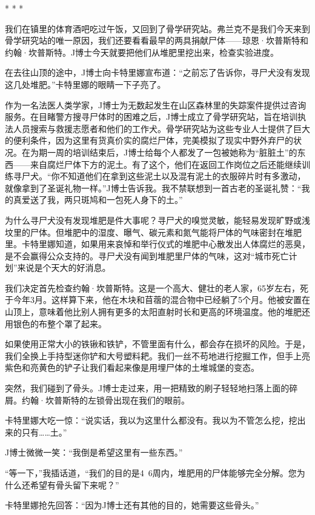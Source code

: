 \documentclass[12pt,oneside]{book}
\begin{document}
\begin{bookref}[frametitle={\cite{好好告别}}]
\begin{center}
* * *
\end{center}

我们在镇里的体育酒吧吃过午饭，又回到了骨学研究站。弗兰克不是我们今天来到骨学研究站的唯一原因，我们还要看看最早的两具捐献尸体——琼恩·坎普斯特和约翰·坎普斯特。J博士今天就要把他们从堆肥里挖出来，检查实验进度。

在去往山顶的途中，J博士向卡特里娜宣布道：“之前忘了告诉你，寻尸犬没有发现这几处堆肥。”卡特里娜的眼睛一下子亮了。

作为一名法医人类学家，J博士为无数起发生在山区森林里的失踪案件提供过咨询服务。在目睹警方搜寻尸体时的困难之后，J博士成立了骨学研究站，旨在培训执法人员搜索与救援志愿者和他们的工作犬。骨学研究站为这些专业人士提供了巨大的便利条件，因为这里有货真价实的腐烂尸体，完美模拟了现实中野外弃尸的状况。在为期一周的培训结束后，J博士给每个人都发了一包被她称为“脏脏土”的东西——来自腐烂尸体下方的泥土。有了这个，他们在返回工作岗位之后还能继续训练寻尸犬。“你不知道他们在拿到这些泥土以及混有泥土的衣服碎片时有多激动，就像拿到了圣诞礼物一样。”J博士告诉我。我不禁联想到一首古老的圣诞礼赞：“我的真爱送了我，两只斑鸠和一包死人身下的土。”

为什么寻尸犬没有发现堆肥是件大事呢？寻尸犬的嗅觉灵敏，能轻易发现旷野或浅坟里的尸体。但堆肥中的湿度、曝气、碳元素和氮气能将尸体的气味密封在堆肥里。卡特里娜知道，如果用来哀悼和举行仪式的堆肥中心散发出人体腐烂的恶臭，是不会赢得公众支持的。寻尸犬没有闻到堆肥里尸体的气味，这对“城市死亡计划”来说是个天大的好消息。

我们决定首先检查约翰·坎普斯特。这是一个高大、健壮的老人家，65岁左右，死于今年3月。这样算下来，他在木块和苜蓿的混合物中已经躺了5个月。他被安置在山顶上，意味着他比别人拥有更多的太阳直射时长和更高的环境温度。他的堆肥还用银色的布整个罩了起来。

如果使用正常大小的铁锹和铁铲，不管里面有什么，都会存在损坏的风险。于是，我们全换上手持型迷你铲和大号塑料耙。我们一丝不苟地进行挖掘工作，但手上亮紫色和亮黄色的铲子让我们看起来像是用埋尸体的土堆城堡的变态。

突然，我们碰到了骨头。J博士走过来，用一把精致的刷子轻轻地扫落上面的碎屑。约翰·坎普斯特的左锁骨出现在我们的眼前。

卡特里娜大吃一惊：“说实话，我以为这里什么都没有。我以为不管怎么挖，挖出来的只有……土。”

J博士微微一笑：“我倒是希望这里有一些东西。”

“等一下，”我插话道，“我们的目的是4~6周内，堆肥用的尸体能够完全分解。您为什么还希望有骨头留下来呢？”

卡特里娜抢先回答：“因为J博士还有其他的目的，她需要这些骨头。”


\end{bookref}
\end{document}
